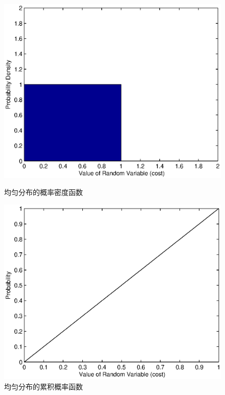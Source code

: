 \begin{figure}[tb] 
  \begin{minipage}[t]{0.5\linewidth} 
    \centering 
    \includegraphics[width = \textwidth]{bayesian_uniform_density_scheme.eps} 
    \caption{均匀分布的概率密度函数} 
    \label{fig:chap_bayesian:uniform_density_scheme} 
  \end{minipage}%
  \begin{minipage}[t]{0.5\linewidth} 
    \centering 
    \includegraphics[width=\textwidth]{bayesian_uniform_cdf_scheme.eps} 
    \caption{均匀分布的累积概率函数} 
    \label{fig:chap_bayesian:uniform_cdf_schem} 
  \end{minipage} 
\end{figure}

